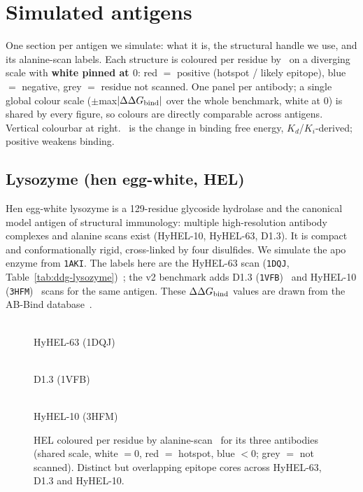 \section{Simulated antigens}\label{sec:simulated-antigens}

One section per antigen we simulate: what it is, the structural handle we use, and its
alanine-scan labels. Each structure is coloured per residue by \ddG\ on a diverging scale
with \textbf{white pinned at $0$}: red $=$ positive (hotspot / likely epitope), blue $=$
negative, grey $=$ residue not scanned. One panel per antibody; a single global colour scale
($\pm$max$|\Delta\Delta G_{\mathrm{bind}}|$ over the whole benchmark, white at $0$) is shared by every figure, so colours
are directly comparable across antigens. Vertical colourbar at right. \ddG\ is the change in
binding free energy, $K_d$/$K_i$-derived; positive weakens binding.

\subsection{Lysozyme (hen egg-white, HEL)}
Hen egg-white lysozyme is a 129-residue glycoside hydrolase and the canonical model antigen of
structural immunology: multiple high-resolution antibody complexes and alanine scans exist
(HyHEL-10, HyHEL-63, D1.3). It is compact and conformationally rigid, cross-linked by four
disulfides. We simulate the apo enzyme from \texttt{1AKI}. The labels here are the HyHEL-63 scan
(\texttt{1DQJ}, Table~\ref{tab:ddg-lysozyme})~\cite{li2000}; the v2 benchmark adds D1.3
(\texttt{1VFB})~\cite{bhat1994} and HyHEL-10 (\texttt{3HFM})~\cite{padlan1989} scans for the same
antigen. These $\Delta\Delta G_{\mathrm{bind}}$ values are drawn from the AB-Bind database~\cite{sirin2016}.
\begin{figure}[H]\centering
\begin{minipage}[c]{0.27\linewidth}\centering{}\\[-2pt]{\small HyHEL-63 (1DQJ)}\end{minipage}\hfill
\begin{minipage}[c]{0.27\linewidth}\centering{}\\[-2pt]{\small D1.3 (1VFB)}\end{minipage}\hfill
\begin{minipage}[c]{0.27\linewidth}\centering{}\\[-2pt]{\small HyHEL-10 (3HFM)}\end{minipage}\hfill
\begin{minipage}[c]{0.13\linewidth}\centering{}\end{minipage}
\caption{HEL coloured per residue by alanine-scan \ddG\ for its three antibodies (shared scale, white $=0$, red $=$ hotspot, blue $<0$; grey $=$ not scanned). Distinct but overlapping epitope cores across HyHEL-63, D1.3 and HyHEL-10.}\end{figure}


